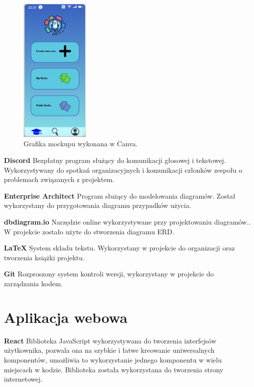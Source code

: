 \begin{figure}[H]
    \centering
    \includegraphics[width=0.3\textwidth]{chapters/chapter_7/canva.png}
    \caption{Grafika mockupu wykonana w Canva.}
    \label{img:canva}
\end{figure}


\textbf{Discord} Bezpłatny program służący do komunikacji głosowej i tekstowej. Wykorzystywany do spotkań organizacyjnych i komunikacji członków zespołu o problemach związanych z projektem.

\medskip

\textbf{Enterprise Architect} Program służący do modelowania diagramów. Został wykorzystany do przygotowania diagramu przypadków użycia.

\medskip

\textbf{dbdiagram.io} Narzędzie online wykorzystywane przy projektowaniu diagramów.. W projekcie zostało użyte do stworzenia diagramu ERD.

\medskip

\textbf{LaTeX} System składu tekstu. Wykorzystany w projekcie do organizacji oraz tworzenia książki projektu.

\medskip

\textbf{Git} Rozproszony system kontroli wersji, wykorzystany w projekcie do zarządzania kodem.

\section{Aplikacja webowa}

\textbf{React} Biblioteka JavaScript wykorzystywana do tworzenia interfejsów użytkownika, pozwala ona na szybkie i łatwe kreowanie uniwersalnych komponentów, umożliwia to wykorzystanie jednego komponentu w wielu miejscach w kodzie. Biblioteka została wykorzystana do tworzenia strony internetowej.

